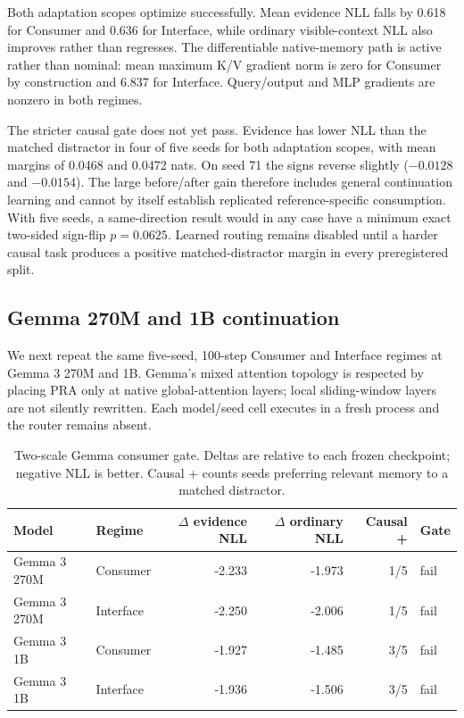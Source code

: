\documentclass[11pt]{article}
\begin{document}
Both adaptation scopes optimize successfully. Mean evidence NLL falls by
0.618 for Consumer and 0.636 for Interface, while ordinary visible-context NLL
also improves rather than regresses. The differentiable native-memory path is
active rather than nominal: mean maximum K/V gradient norm is zero for
Consumer by construction and 6.837 for Interface. Query/output and MLP
gradients are nonzero in both regimes.

The stricter causal gate does not yet pass. Evidence has lower NLL than the
matched distractor in four of five seeds for both adaptation scopes, with mean
margins of 0.0468 and 0.0472 nats. On seed 71 the signs reverse slightly
($-0.0128$ and $-0.0154$). The large before/after gain therefore includes
general continuation learning and cannot by itself establish replicated
reference-specific consumption. With five seeds, a same-direction result
would in any case have a minimum exact two-sided sign-flip $p=0.0625$.
Learned routing remains disabled until a harder causal task produces a
positive matched-distractor margin in every preregistered split.

\subsection{Gemma 270M and 1B continuation}

We next repeat the same five-seed, 100-step Consumer and Interface regimes at
Gemma 3 270M and 1B. Gemma's mixed attention topology is respected by placing
PRA only at native global-attention layers; local sliding-window layers are not
silently rewritten. Each model/seed cell executes in a fresh process and the
router remains absent.

\begin{table}[!htbp]
\centering
\scriptsize
\caption{Two-scale Gemma consumer gate. Deltas are relative to each frozen
checkpoint; negative NLL is better. Causal + counts seeds preferring relevant
memory to a matched distractor.}
\begin{tabular}{llrrrl}
\toprule
Model & Regime & $\Delta$ evidence NLL & $\Delta$ ordinary NLL & Causal + & Gate \\
\midrule
Gemma 3 270M & Consumer & -2.233 & -1.973 & 1/5 & fail \\
Gemma 3 270M & Interface & -2.250 & -2.006 & 1/5 & fail \\
Gemma 3 1B & Consumer & -1.927 & -1.485 & 3/5 & fail \\
Gemma 3 1B & Interface & -1.936 & -1.506 & 3/5 & fail \\
\bottomrule
\end{tabular}
\label{tab:paper4-gemma-consumer-gate}
\end{table}
\end{document}
